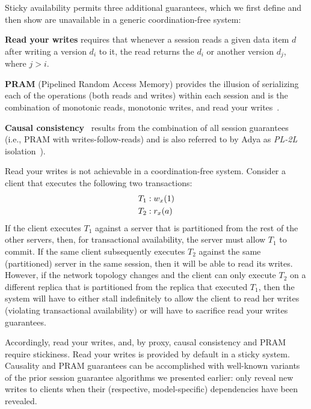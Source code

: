 Sticky availability permits three additional guarantees, which we
first define and then show are unavailable in a generic
coordination-free system:

\vspace{.5em}\noindent\textbf{{Read your writes}} requires that
whenever a session reads a given data item $d$ after writing a version
$d_i$ to it, the read returns the $d_i$ or another version $d_j$,
where $j > i$.

\vspace{.5em}\noindent\textbf{{PRAM}} (Pipelined Random Access Memory)
provides the illusion of serializing each of the operations (both
reads and writes) within each session and is the combination of
monotonic reads, monotonic writes, and read your
writes~\cite{herlihy-art}.

\vspace{.5em}\noindent\textbf{{Causal
    consistency}}~\cite{causalmemory} results from the combination of
all session guarantees~\cite{sessiontocausal} (i.e., PRAM with
writes-follow-reads) and is also referred to by Adya as \textit{PL-2L}
isolation~\cite{adya}).\vspace{.5em}

Read your writes is not achievable in a coordination-free system. Consider a client that executes the following two transactions:
\begin{align*}
\small
T_1 &: w_x(1)
\\T_2 &: r_x(a)
\end{align*}
If the client executes $T_1$ against a server that is partitioned from
the rest of the other servers, then, for transactional availability,
the server must allow $T_1$ to commit. If the same client subsequently
executes $T_2$ against the same (partitioned) server in the same
session, then it will be able to read its writes. However, if the
network topology changes and the client can only execute $T_2$ on a
different replica that is partitioned from the replica that executed
$T_1$, then the system will have to either stall indefinitely to allow
the client to read her writes (violating transactional availability)
or will have to sacrifice read your writes guarantees.

Accordingly, read your writes, and, by proxy, causal consistency and
PRAM require stickiness. Read your writes is provided by default in a
sticky system. Causality and PRAM guarantees can be accomplished with
well-known variants~\cite{causalmemory, bolton, eiger,
  sessionguarantees, swift} of the prior session guarantee algorithms
we presented earlier: only reveal new writes to clients when their
(respective, model-specific) dependencies have been revealed.

